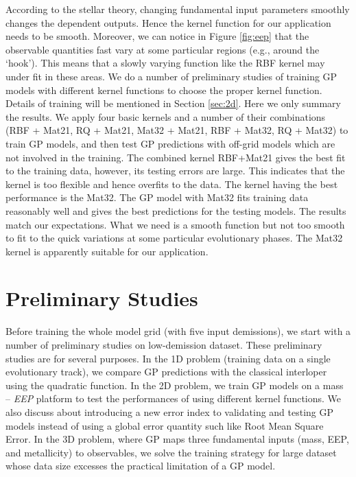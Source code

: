 According to the stellar theory, changing fundamental input parameters smoothly changes the dependent outputs. Hence the kernel function for our application needs to be smooth. Moreover, we can notice in Figure \ref{fig:eep} that the observable quantities fast vary at some particular regions (e.g., around the `hook'). This means that a slowly varying function like the RBF kernel may under fit in these areas. We do a number of preliminary studies of training GP models with different kernel functions to choose the proper kernel function. Details of training will be mentioned in Section \ref{sec:2d}. Here we only summary the results. 
%
We apply four basic kernels and a number of their combinations (RBF + Mat21, RQ + Mat21, Mat32 + Mat21, RBF + Mat32, RQ + Mat32) to train GP models, and then test GP predictions with off-grid models which are not involved in the training. The combined kernel RBF+Mat21 gives the best fit to the training data, however, its testing errors are large. This indicates that the kernel is too flexible and hence overfits to the data.  
%
The kernel having the best performance is the Mat32. The GP model with Mat32 fits training data reasonably well and gives the best predictions for the testing models. 
%
The results match our expectations. What we need is a smooth function but not too smooth to fit to the quick variations at some particular evolutionary phases. The Mat32 kernel is apparently suitable for our application. 

\section{Preliminary Studies}\label{examples}

Before training the whole model grid (with five input demissions), we start with a number of preliminary studies on low-demission dataset. 
%
These preliminary studies are for several purposes. In the 1D problem (training data on a single evolutionary track), we compare GP predictions with the classical interloper using the quadratic function. In the 2D problem, we train GP models on a mass -- {\it EEP} platform to test the performances of using different kernel functions. We also discuss about introducing a new error index to validating and testing GP models instead of using a global error quantity such like Root Mean Square Error.
%
In the 3D problem, where GP maps three fundamental inputs (mass, EEP, and metallicity) to observables, we solve the training strategy for large dataset whose data size excesses the practical limitation of a GP model. 

